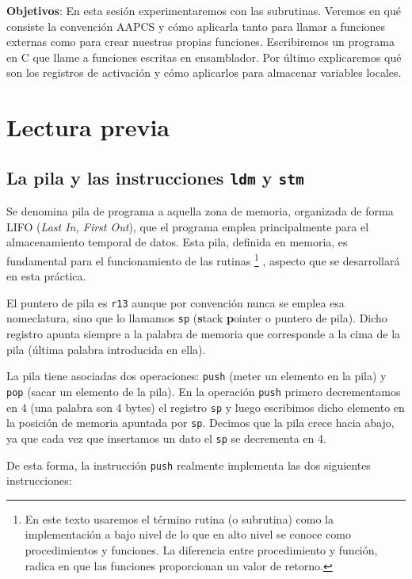 \label{chp:Subrut}
\minitoc

{\bf Objetivos}: En esta sesión experimentaremos con las
subrutinas. Veremos en qué consiste la convención AAPCS y cómo
aplicarla tanto para llamar a funciones externas como para crear
nuestras propias funciones. Escribiremos un programa en C que llame
a funciones escritas en ensamblador. Por último explicaremos qué
son los registros de activación y cómo aplicarlos para almacenar
variables locales.

\section{Lectura previa}

\subsection{La pila y las instrucciones {\tt ldm} y {\tt stm}}

Se denomina pila de programa a aquella zona de memoria, organizada de
forma LIFO ({\it Last In, First Out}), que el programa emplea
principalmente para el almacenamiento temporal de datos.
%
Esta pila, definida en memoria, es fundamental para el funcionamiento
de las rutinas%
\footnote{
En este texto usaremos el término rutina (o subrutina) 
como la implementación
a bajo nivel de lo que en alto nivel se conoce como procedimientos
y funciones. La diferencia entre procedimiento y función, radica
en que las funciones proporcionan un valor de retorno. 
}%
, aspecto que se desarrollará en esta práctica.

El puntero de pila es {\tt r13} aunque por convención nunca se emplea esa
nomeclatura, sino que lo llamamos {\tt sp} ({\bf s}tack {\bf p}ointer o puntero
de pila). Dicho registro apunta siempre a la palabra de memoria que corresponde
a la cima de la pila (última palabra introducida en ella).

La pila tiene asociadas dos operaciones: {\tt push} (meter un elemento en la pila) y
{\tt pop} (sacar un elemento de la pila). En la operación {\tt push} primero
decrementamos en 4 (una palabra son 4 bytes) el registro {\tt sp} y luego escribimos
dicho elemento en la posición de memoria apuntada por {\tt sp}. Decimos que la pila
crece hacia abajo, ya que cada vez que insertamos un dato el {\tt sp} se decrementa
en 4.

De esta forma, la instrucción {\tt push} realmente implementa las dos siguientes
instrucciones:

